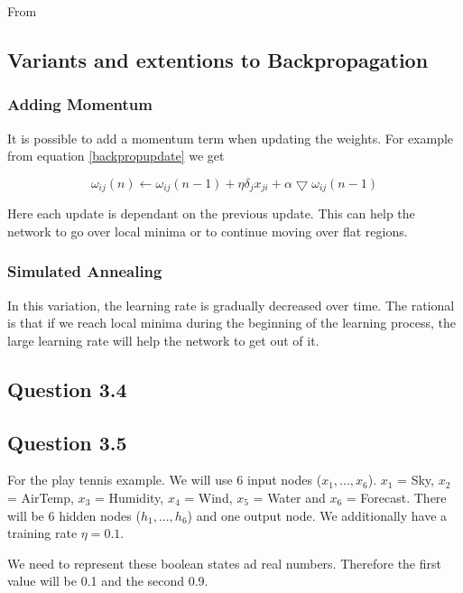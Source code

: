 \documentclass[10pt,a4paper]{article}
\begin{document}
From \cite[p98]{Michell2009}

\subsection{Variants and extentions to Backpropagation}

\subsubsection{Adding Momentum}

It is possible to add a momentum term when updating the weights. For example from equation \ref{backpropupdate} we get

\begin{equation}
\omega_{ij}(n) \leftarrow \omega_{ij}(n-1) + \eta \delta_j x_{ji} + \alpha\bigtriangledown\omega_{ij}(n-1)
\end{equation}

Here each update is dependant on the previous update. This can help the network to go over local minima or to continue moving over flat regions. \citep[p100]{Michell2009}

\subsubsection{Simulated Annealing}

In this variation, the learning rate is gradually decreased over time. The rational is that if we reach local minima during the beginning of the learning process, the large learning rate will help the network to get out of it. \citep{nils}
\subsection{Question 3.4}

\subsection{Question 3.5}

For the play tennis example. We will use 6 input nodes ($x_1,...,x_6$). $x_1$ = Sky, $x_2$ = AirTemp, $x_3$ = Humidity, $x_4$ = Wind, $x_5$ = Water and $x_6$ = Forecast. There will be 6 hidden nodes ($h_1,...,h_6$) and one output node. We additionally have a training rate $\eta = 0.1$.

We need to represent these boolean states ad real numbers. Therefore the first value will be 0.1 and the second 0.9. 
\end{document}
